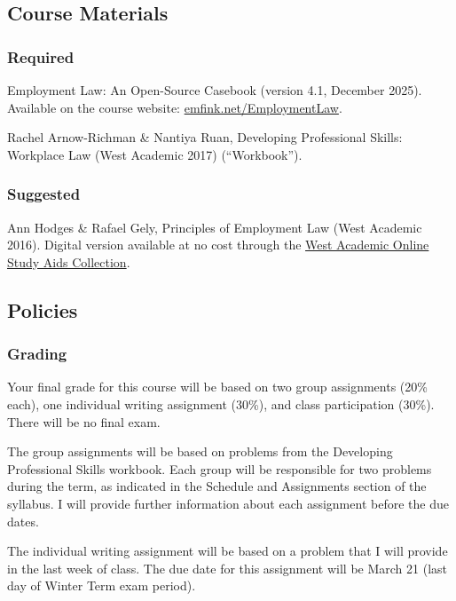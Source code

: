 \documentclass[11pt,letterpaper,twoside]{article}
\begin{document}
\subsection*{Course Materials}\label{course-materials}

\subsubsection{Required}\label{required}

Employment Law: An Open-Source Casebook (version 4.1, December 2025).
Available on the course website:
\href{http://www.emfink.net/EmploymentLaw}{emfink.net/EmploymentLaw}.

Rachel Arnow-Richman \& Nantiya Ruan, Developing Professional Skills:
Workplace Law (West Academic 2017) (``Workbook'').

\subsubsection{Suggested}\label{suggested}

Ann Hodges \& Rafael Gely, Principles of Employment Law (West Academic
2016). Digital version available at no cost through the
\href{https://subscription.westacademic.com/}{West Academic Online Study
Aids Collection}.

\subsection*{Policies}\label{policies}

\subsubsection{Grading}\label{grading}

Your final grade for this course will be based on two group assignments
(20\% each), one individual writing assignment (30\%), and class
participation (30\%). There will be no final exam.

The group assignments will be based on problems from the Developing
Professional Skills workbook. Each group will be responsible for two
problems during the term, as indicated in the Schedule and Assignments
section of the syllabus. I will provide further information about each
assignment before the due dates.

The individual writing assignment will be based on a problem that I will
provide in the last week of class. The due date for this assignment will
be March 21 (last day of Winter Term exam period).
\end{document}
